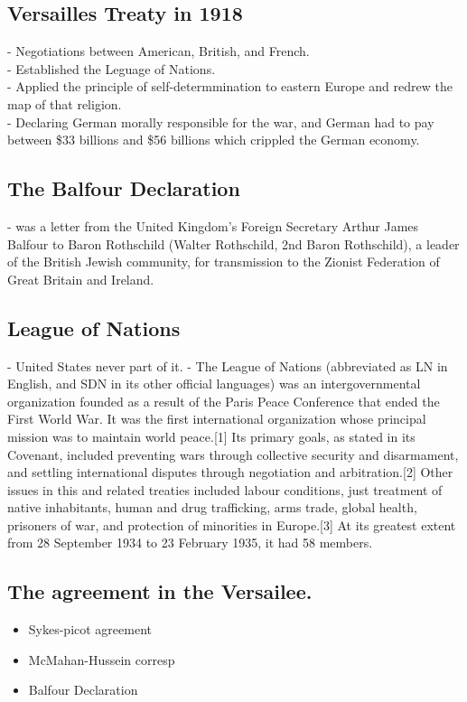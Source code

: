 \documentclass{article}
\begin{document}
\subsection{ Versailles Treaty in 1918}
- Negotiations between American, British, and French.\\
- Established the Leguage of Nations.\\
- Applied the principle of self-determmination to eastern Europe and redrew the map of that religion.\\
- Declaring German morally responsible for the war, and German had to pay between \$33 billions and \$56 billions which crippled the German economy.\\

\subsection{The Balfour Declaration }
 - was a letter from the United Kingdom's Foreign Secretary Arthur James Balfour
to Baron Rothschild (Walter Rothschild, 2nd Baron Rothschild), a leader of the British Jewish community, for transmission to the Zionist Federation of Great Britain and Ireland.
\subsection{League of Nations}
- United States never part of it.
- The League of Nations (abbreviated as LN in English, and SDN in its other
official languages) was an intergovernmental organization founded as a result of the Paris Peace Conference that ended the First World War. It was the first international organization whose principal mission was to maintain world peace.[1] Its primary goals, as stated in its Covenant, included preventing wars through collective security and disarmament, and settling international disputes through negotiation and arbitration.[2] Other issues in this and related treaties included labour conditions, just treatment of native inhabitants, human and drug trafficking, arms trade, global health, prisoners of war, and protection of minorities in Europe.[3] At its greatest extent from 28 September 1934 to 23 February 1935, it had 58 members.

\subsection{The agreement in the Versailee.}
\begin{itemize}
  \item Sykes-picot agreement
  \item McMahan-Hussein corresp
  \item Balfour Declaration
\end{itemize}
\end{document}
